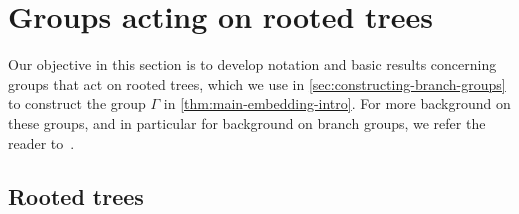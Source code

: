 \documentclass[a4paper]{amsart}
\numberwithin{equation}{section}
\theoremstyle{definition}
\theoremstyle{remark}
\begin{document}
\section{Groups acting on rooted trees}

\noindent Our objective in this section is to develop notation and basic results concerning groups that act on rooted trees, which we use in \cref{sec:constructing-branch-groups} to construct the group $\Gamma$ in \cref{thm:main-embedding-intro}.
For more background on these groups, and in particular for background on branch groups, we refer the reader to~\cite{BGS-branch}.

\subsection{Rooted trees}\label{subsec:rooted-trees}
\end{document}
